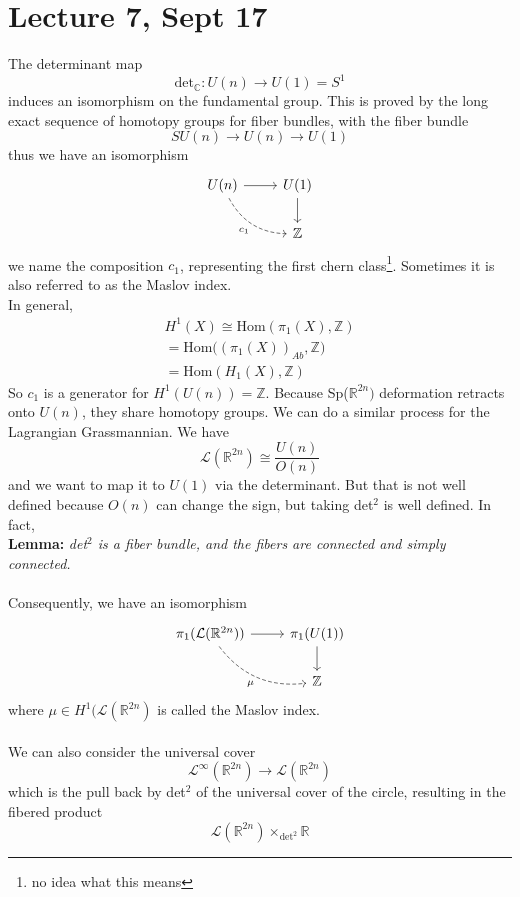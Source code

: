 \documentclass[12pt]{report}
\theoremstyle{definition}
\theoremstyle{remark}
\numberwithin{equation}{section}
\theoremstyle{definition}
\newcommand{\bb}[1]{\mathbb{#1}}
\begin{document}
\section*{Lecture 7, Sept 17}
\label{sec:7}
The determinant map 
$$
	\text{det}_\bb C: U(n) \to U(1) = S^1
$$
induces an isomorphism on the fundamental group. This is proved by the long exact sequence of homotopy groups for fiber bundles, with the fiber bundle
$$
	SU(n) \to U(n) \to U(1)
$$
thus we have an isomorphism 
$$
	\begin{tikzcd}
U(n) \arrow[r] \arrow[rd, "c_1"', dashed, bend right] & U(1) \arrow[d] \\
                                                      & \bb Z         
\end{tikzcd}
$$
we name the composition $c_1$, representing the first chern class\footnote{no idea what this means}. Sometimes it is also referred to as the Maslov index. \\
In general, 
\begin{gather*}
	H^1(X) \cong \text{Hom}(\pi_1(X),\bb Z)\\
= \text{Hom}\big((\pi_1(X))_{Ab},\bb Z	\big)\\
= \text{Hom}(H_1(X),\bb Z)
\end{gather*}
So $c_1$ is a generator for $H^1(U(n)) = \bb Z$. Because Sp($\bb R^{2n})$ deformation retracts onto $U(n)$, they share homotopy groups. We can do a similar process for the Lagrangian Grassmannian. We have 
$$
	\mathcal{L}(\bb R^{2n}) \cong \frac{U(n)}{O(n)}
$$
and we want to map it to $U(1)$ via the determinant. But that is not well defined because $O(n)$ can change the sign, but taking det$^2$ is well defined. In fact, \\
\textbf{Lemma: }\textit{det$^2$ is a fiber bundle, and the fibers are connected and simply connected. }\\\\
Consequently, we have an isomorphism 
$$
	\begin{tikzcd}
\pi_1(\mathcal{L}(\bb R^{2n})) \arrow[r] \arrow[rd, "\mu"', dashed, bend right] & \pi_1(U(1)) \arrow[d] \\
                                                                               & \bb Z                
\end{tikzcd}
$$
where $\mu \in H^1(\mathcal{L}(\bb R^{2n})$ is called the Maslov index. \\\\
We can also consider the universal cover
$$
	\mathcal{L}^\infty(\bb R^{2n}) \to \mathcal{L}(\bb R^{2n})
$$
which is the pull back by det$^2$ of the universal cover of the circle, resulting in the fibered product
$$
\mathcal{L}(\bb R^{2n}) \times_{\text{det}^2} \bb R
$$
\end{document}
